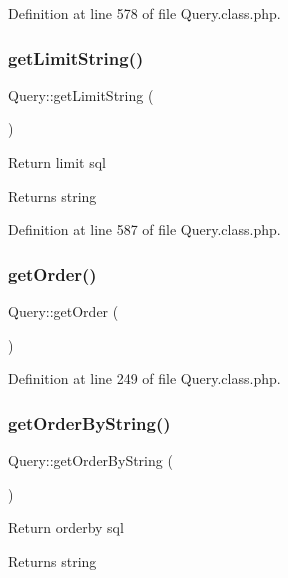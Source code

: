 Definition at line 578 of file Query.\+class.\+php.

\hypertarget{classQuery_a693e75de6fb7cfbc07f73792ac800246}{}\label{classQuery_a693e75de6fb7cfbc07f73792ac800246} 
\subsubsection{\texorpdfstring{get\+Limit\+String()}{getLimitString()}}
{\footnotesize\ttfamily Query\+::get\+Limit\+String (\begin{DoxyParamCaption}{ }\end{DoxyParamCaption})}

Return limit sql \begin{DoxyReturn}{Returns}
string 
\end{DoxyReturn}


Definition at line 587 of file Query.\+class.\+php.

\hypertarget{classQuery_a41f8624567819ead73e5b57935e526c7}{}\label{classQuery_a41f8624567819ead73e5b57935e526c7} 
\subsubsection{\texorpdfstring{get\+Order()}{getOrder()}}
{\footnotesize\ttfamily Query\+::get\+Order (\begin{DoxyParamCaption}{ }\end{DoxyParamCaption})}



Definition at line 249 of file Query.\+class.\+php.

\hypertarget{classQuery_a43b8446cd8699978988b8ea0bc2642dd}{}\label{classQuery_a43b8446cd8699978988b8ea0bc2642dd} 
\subsubsection{\texorpdfstring{get\+Order\+By\+String()}{getOrderByString()}}
{\footnotesize\ttfamily Query\+::get\+Order\+By\+String (\begin{DoxyParamCaption}{ }\end{DoxyParamCaption})}

Return orderby sql \begin{DoxyReturn}{Returns}
string 
\end{DoxyReturn}



